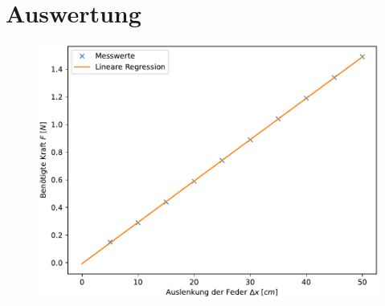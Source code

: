 \section{Auswertung}
\label{sec:Auswertung}

\begin{figure}
    \centering
    \includegraphics{plot.pdf}
\end{figure}

